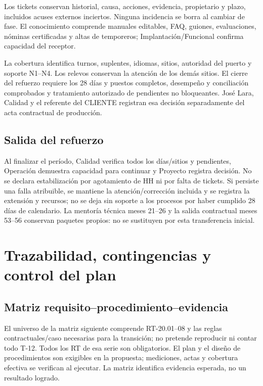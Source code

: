 Los tickets conservan historial, causa, acciones, evidencia, propietario y plazo, incluidos acuses externos inciertos. Ninguna incidencia se borra al cambiar de fase. El conocimiento comprende manuales editables, FAQ, guiones, evaluaciones, nóminas certificadas y altas de temporeros; Implantación/Funcional confirma capacidad del receptor.

La cobertura identifica turnos, suplentes, idiomas, sitios, autoridad del puerto y soporte N1--N4. Los relevos conservan la atención de los demás sitios. El cierre del refuerzo requiere los 28 días y puestos completos, desempeño y conciliación comprobados y tratamiento autorizado de pendientes no bloqueantes. José Lara, Calidad y el referente del CLIENTE registran esa decisión separadamente del acta contractual de producción.


\subsection{Salida del refuerzo}
Al finalizar el período, Calidad verifica todos los días/sitios y pendientes, Operación demuestra capacidad para continuar y Proyecto registra decisión. No se declara estabilización por agotamiento de HH ni por falta de tickets. Si persiste una falla atribuible, se mantiene la atención/corrección incluida y se registra la extensión y recursos; no se deja sin soporte a los procesos por haber cumplido 28 días de calendario. La mentoría técnica meses 21--26 y la salida contractual meses 53--56 conservan paquetes propios: no se sustituyen por esta transferencia inicial.

\section{Trazabilidad, contingencias y control del plan}\label{sec:t18-control-plan}
\subsection{Matriz requisito--procedimiento--evidencia}
El universo de la matriz siguiente comprende RT-20.01--08 y las reglas contractuales/caso necesarias para la transición; no pretende reproducir ni contar todo T-12. Todos los RT de esa serie son obligatorios. El plan y el diseño de procedimientos son exigibles en la propuesta; mediciones, actas y cobertura efectiva se verifican al ejecutar. La matriz identifica evidencia esperada, no un resultado logrado.


